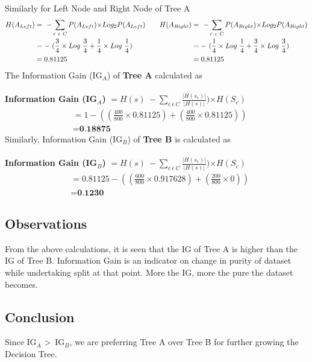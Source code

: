 \documentclass[a4paper,11pt]{article}
\newcommand\tab[1][1cm]{\hspace*{#1}}
\begin{document}
\begin{mlsolution}
\noindent
\tab Similarly for  Left Node and Right Node of Tree A\\
\begin{equation*}
  \begin{split}
    H(A_{Left}) &= \ -\sum\limits_{c\  \epsilon\  C}  P(A_{Left}) {\times Log_2 P(A_{Left})}\\
    &= -\ (\frac{3}{4} \times Log\ \frac{3}{4} + \frac{1}{4} \times Log\ \frac{1}{4} )\\
    &= 0.81125
  \end{split}
\quad\linebreak\quad
  \begin{split}
    H(A_{Right}) &= \ -\sum\limits_{c\  \epsilon\  C}  P(A_{Right}) {\times Log_2 P(A_{Right})}\\
    &= -\ (\frac{1}{4} \times Log\ \frac{1}{4} + \frac{3}{4} \times Log\ \frac{3}{4} )\\
    &= 0.81125
  \end{split}
\end{equation*}
\tab The Information Gain (IG$_A$) of \textbf{Tree A} calculated as\\
\\
\tab \textbf{Information Gain (IG$_A$)} $= H(s)\ -\sum\limits_{c\  \epsilon\  C}  \frac{|H(s_c)|}{|H(s)|}) {\times H(S_c)}$
\begin{align*}
  &=1-((\frac{400}{800} \times 0.81125) + (\frac{400}{800} \times 0.81125))\\
  &= \textbf{0.18875}
\end{align*}
\noindent
\tab Similarly, Information Gain (IG$_B$) of \textbf{Tree B} is calculated as\\
\\
\tab \textbf{Information Gain (IG$_B$)} $= H(s)\ -\sum\limits_{c\  \epsilon\  C}  \frac{|H(s_c)|}{|H(s)|}) {\times H(S_c)}$
\begin{align*}
  &=0.81125-((\frac{600}{800} \times 0.917628) + (\frac{200}{800} \times 0))\\
  &= \textbf{0.1230}
\end{align*}
\subsection{Observations}
\tab From the above calculations, it is seen that the IG of Tree A is higher than the IG of Tree B.  Information Gain is an indicator on change in purity of dataset while undertaking split at that point. More the IG, more the pure the dataset  becomes.
\subsection{Conclusion}
\tab Since IG$_A$ \textgreater\ IG$_B$, we are preferring Tree A over Tree B for further growing the Decision Tree.

\end{mlsolution}
\end{document}

